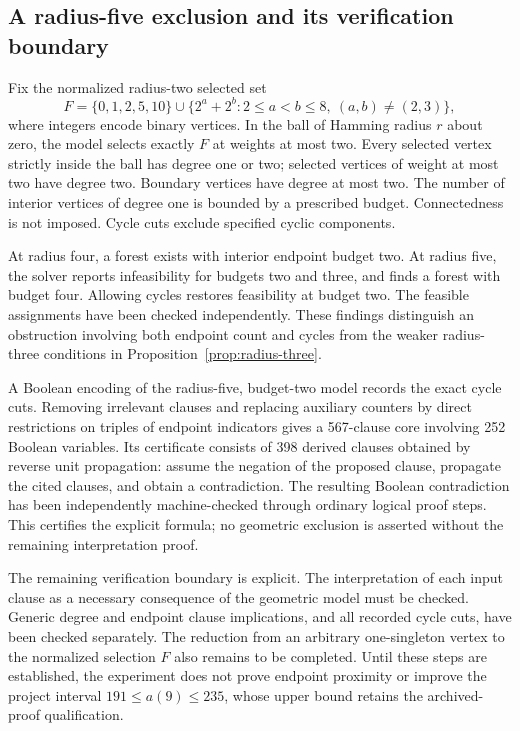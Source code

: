 \documentclass[11pt,a4paper]{article}
\theoremstyle{definition}
\theoremstyle{remark}
\begin{document}
\subsection{A radius-five exclusion and its verification boundary}
Fix the normalized radius-two selected set
\[
F=\{0,1,2,5,10\}\cup
\{2^a+2^b:2\le a<b\le8,\ (a,b)\ne(2,3)\},
\]
where integers encode binary vertices. In the ball of Hamming radius $r$ about zero, the model selects exactly $F$ at weights at most two. Every selected vertex strictly inside the ball has degree one or two; selected vertices of weight at most two have degree two. Boundary vertices have degree at most two. The number of interior vertices of degree one is bounded by a prescribed budget. Connectedness is not imposed. Cycle cuts exclude specified cyclic components.

At radius four, a forest exists with interior endpoint budget two. At radius five, the solver reports infeasibility for budgets two and three, and finds a forest with budget four. Allowing cycles restores feasibility at budget two. The feasible assignments have been checked independently. These findings distinguish an obstruction involving both endpoint count and cycles from the weaker radius-three conditions in Proposition~\ref{prop:radius-three}.

A Boolean encoding of the radius-five, budget-two model records the exact cycle cuts. Removing irrelevant clauses and replacing auxiliary counters by direct restrictions on triples of endpoint indicators gives a 567-clause core involving 252 Boolean variables. Its certificate consists of 398 derived clauses obtained by reverse unit propagation: assume the negation of the proposed clause, propagate the cited clauses, and obtain a contradiction. The resulting Boolean contradiction has been independently machine-checked through ordinary logical proof steps. This certifies the explicit formula; no geometric exclusion is asserted without the remaining interpretation proof.

The remaining verification boundary is explicit. The interpretation of each input clause as a necessary consequence of the geometric model must be checked. Generic degree and endpoint clause implications, and all recorded cycle cuts, have been checked separately. The reduction from an arbitrary one-singleton vertex to the normalized selection $F$ also remains to be completed. Until these steps are established, the experiment does not prove endpoint proximity or improve the project interval $191\le a(9)\le235$, whose upper bound retains the archived-proof qualification.
\end{document}
